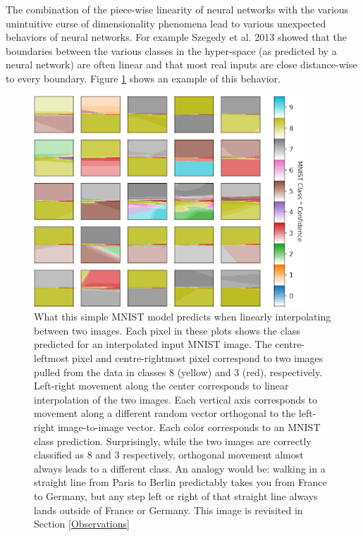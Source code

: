 \documentclass[12pt,oneside]{CUNY_PhD}
\begin{document}
The combination of the piece-wise linearity of neural networks with the various unintuitive curse of dimensionality phenomena lead to various unexpected behaviors of neural networks. For example Szegedy et al. 2013 \cite{szegedy2013intriguing} showed that the boundaries between the various classes in the hyper-space (as predicted by a neural network) are often linear and that most real inputs are close distance-wise to every boundary. Figure \ref{fig:mot-bounds} shows an example of this behavior.
\begin{figure}[!t]
    \centering
    \includegraphics[width=0.9\textwidth]{images/Motivation/boundaries.png}
    \caption{What this simple MNIST model predicts when linearly interpolating between two images. Each pixel in these plots shows the class predicted for an interpolated input MNIST image. The centre-leftmost pixel and centre-rightmost pixel correspond to two images pulled from the data in classes 8 (yellow) and 3 (red), respectively. Left-right movement along the center corresponds to linear interpolation of the two images. Each vertical axis corresponds to movement along a different random vector orthogonal to the left-right image-to-image vector. Each color corresponds to an MNIST class prediction. Surprisingly, while the two images are correctly classified as 8 and 3 respectively, orthogonal movement almost always leads to a different class. An analogy would be: walking in a straight line from Paris to Berlin predictably takes you from France to Germany, but any step left or right of that straight line always lands outside of France or Germany. This image is revisited in Section \ref{Observations}}
    \label{fig:mot-bounds}
\end{figure}
\end{document}
